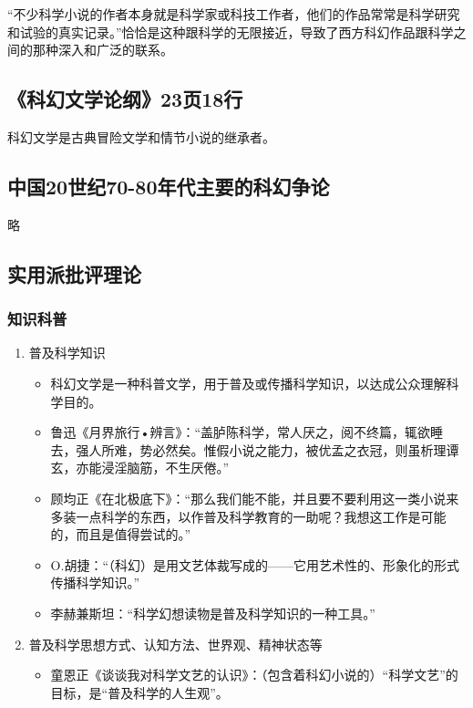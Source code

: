 \documentclass{ctexart}
\begin{document}
    “不少科学小说的作者本身就是科学家或科技工作者，他们的作品常常是科学研究和试验的真实记录。”恰恰是这种跟科学的无限接近，导致了西方科幻作品跟科学之间的那种深入和广泛的联系。



\subsection{《科幻文学论纲》23页18行}

    科幻文学是古典冒险文学和情节小说的继承者。



\subsection{中国20世纪70-80年代主要的科幻争论}

    略



\subsection{实用派批评理论}

\subsubsection{知识科普}

\begin{enumerate}
    \item 普及科学知识
        \begin{itemize}
            \item 科幻文学是一种科普文学，用于普及或传播科学知识，以达成公众理解科学目的。
            \item 鲁迅《月界旅行•辨言》：“盖胪陈科学，常人厌之，阅不终篇，辄欲睡去，强人所难，势必然矣。惟假小说之能力，被优孟之衣冠，则虽析理谭玄，亦能浸淫脑筋，不生厌倦。”
            \item 顾均正《在北极底下》：“那么我们能不能，并且要不要利用这一类小说来多装一点科学的东西，以作普及科学教育的一助呢？我想这工作是可能的，而且是值得尝试的。”
            \item O.胡捷：“（科幻）是用文艺体裁写成的——它用艺术性的、形象化的形式传播科学知识。”
            \item 李赫兼斯坦：“科学幻想读物是普及科学知识的一种工具。”
        \end{itemize}
    \item 普及科学思想方式、认知方法、世界观、精神状态等
        \begin{itemize}
            \item 童恩正《谈谈我对科学文艺的认识》：（包含着科幻小说的）“科学文艺”的目标，是“普及科学的人生观”。
        \end{itemize}
\end{enumerate}
\end{document}
